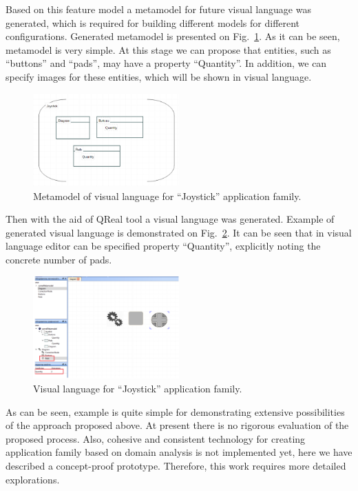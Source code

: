 \documentclass[conference]{IEEEtran}
\begin{document}
Based on this feature model a metamodel for future visual language was generated, which is required for building different models for different configurations. Generated metamodel is presented on Fig.~\ref{image:joystickMetamodel}. As it can be seen, metamodel is very simple. At this stage we can propose that entities, such as ``buttons'' and ``pads'', may have a property ``Quantity''. In addition, we can specify images for these entities, which will be shown in visual language. 

\begin{figure}[H]
	\centering
	\includegraphics[width=0.5\textwidth]{joystickMetamodel.png}
	\caption{Metamodel of visual language for ``Joystick'' application family.}
	\label{image:joystickMetamodel}
\end{figure}

Then with the aid of QReal tool a visual language was generated. Example of generated visual language is demonstrated on Fig.~\ref{image:joystickDsl}. It can be seen that in visual language editor can be specified property ``Quantity'', explicitly noting the concrete number of pads. 


\begin{figure}[H]
	\centering
	\includegraphics[width=0.5\textwidth]{joystickDsl.png}
	\caption{Visual language for ``Joystick'' application family.}
	\label{image:joystickDsl}
\end{figure}

As can be seen, example is quite simple for demonstrating extensive possibilities of the approach proposed above. At present there is no rigorous evaluation of the proposed process. Also, cohesive and consistent technology for creating application family based on domain analysis is not implemented yet, here we have described a concept-proof prototype. Therefore, this work requires more detailed explorations.
\end{document}
